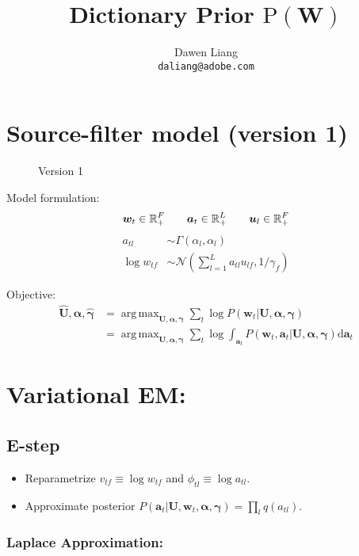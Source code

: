 \documentclass{article}
\title{Dictionary Prior $\mathrm{P}(\mathbf{W})$}
\author{
Dawen Liang \\
\texttt{daliang@adobe.com}
} \date{}
\DeclareMathOperator*{\argmax}{arg\,max}
\begin{document}
%
\maketitle
%

\section{Source-filter model (version 1)}
\begin{figure}[ht]
  \centering
      
  \caption{Version 1}
\label{fig:plate}
\end{figure}

Model formulation:
\[
\bm{w}_t \in \mathbb{R}_{+}^{F} \qquad \bm{a}_t \in \mathbb{R}_{+}^{L} \qquad \bm{u}_l  \in \mathbb{R}_{+}^{F}\\
\]
\begin{align*}
a_{tl} &\sim \Gamma(\alpha_l, \alpha_l)\\
\log {w}_{tf} &\sim \mathcal{N}(\sum_{l=1}^L a_{tl} u_{lf}, 1/\gamma_f)
\end{align*}

Objective:
\begin{align*}
\hat{\mathbf{U}}, \hat{\bm{\alpha}}, \hat{\bm{\gamma}} &= \argmax_{\mathbf{U}, \bm{\alpha}, \bm{\gamma}} \sum_t \log P(\bm{w}_t | \mathbf{U}, \bm{\alpha}, \bm{\gamma})\\
&= \argmax_{\mathbf{U}, \bm{\alpha}, \bm{\gamma}} \sum_t \log \int_{\bm{a}_t} P(\bm{w}_t, \bm{a}_t | \mathbf{U}, \bm{\alpha}, \bm{\gamma}) \mathrm{d} \bm{a}_t
\end{align*}


\section{Variational EM:}
\subsection{E-step}
\begin{itemize}
\item Reparametrize $v_{tf} \equiv \log w_{tf}$ and $\phi_{tl} \equiv \log a_{tl}$.
\item Approximate posterior $P(\bm{a}_t | \mathbf{U}, \bm{w}_t, \bm{\alpha}, \bm{\gamma}) = \prod_{l} q(a_{tl})$.
\end{itemize}

\subsubsection{Laplace Approximation:} 
\end{document}
